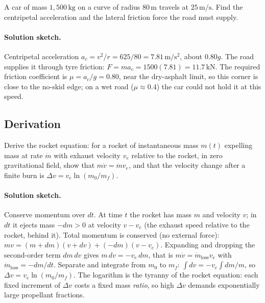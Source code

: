 \begin{exercise}
A car of mass $1{,}500\,\si{\kilogram}$ on a curve of radius
$80\,\si{\meter}$ travels at $25\,\si{\meter\per\second}$. Find the
centripetal acceleration and the lateral friction force the road
must supply.
\paragraph{Solution sketch.} Centripetal acceleration $a_{c}=v^{2}/r=
625/80=7.81\,\si{\meter\per\second\squared}$, about $0.80g$. The road
supplies it through tyre friction: $F=ma_{c}=1500(7.81)=
11.7\,\si{\kilo\newton}$. The required friction coefficient is
$\mu=a_{c}/g=0.80$, near the dry-asphalt limit, so this corner is
close to the no-skid edge; on a wet road ($\mu\approx 0.4$) the car
could not hold it at this speed.
\end{exercise}

\subsection*{Derivation}

\begin{exercise}
Derive the rocket equation: for a rocket of instantaneous mass $m(t)$
expelling mass at rate $\dot{m}$ with exhaust velocity $v_e$ relative
to the rocket, in zero gravitational field, show that $m\dot{v} =
\dot{m} v_e$, and that the velocity change after a finite burn is
$\Delta v = v_e \ln(m_0/m_f)$.
\paragraph{Solution sketch.} Conserve momentum over $dt$. At time $t$
the rocket has mass $m$ and velocity $v$; in $dt$ it ejects mass
$-dm>0$ at velocity $v-v_{e}$ (the exhaust speed relative to the
rocket, behind it). Total momentum is conserved (no external force):
$mv=(m+dm)(v+dv)+(-dm)(v-v_{e})$. Expanding and dropping the
second-order term $dm\,dv$ gives $m\,dv=-v_{e}\,dm$, that is
$m\dot{v}=\dot{m}_{\text{loss}}v_{e}$ with $\dot{m}_{\text{loss}}=
-dm/dt$. Separate and integrate from $m_{0}$ to $m_{f}$:
$\int dv=-v_{e}\int dm/m$, so $\Delta v=v_{e}\ln(m_{0}/m_{f})$. The
logarithm is the tyranny of the rocket equation: each fixed increment
of $\Delta v$ costs a fixed mass \emph{ratio}, so high $\Delta v$
demands exponentially large propellant fractions.
\end{exercise}

